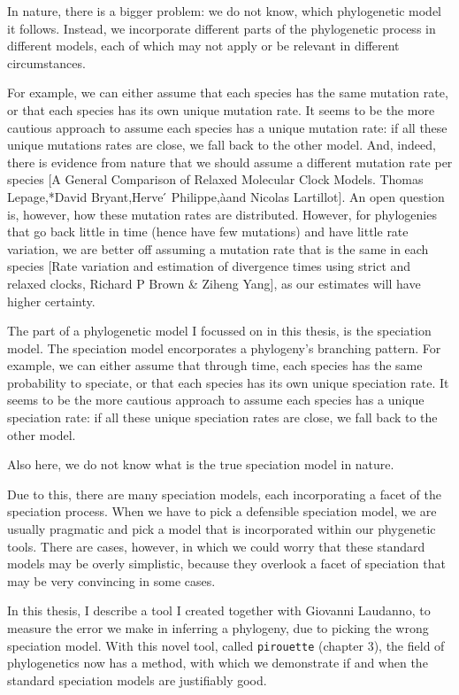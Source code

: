 In nature, there is a bigger problem: 
we do not know, which phylogenetic model it follows.
Instead, we incorporate different parts
of the phylogenetic process in different models, 
each of which may not apply or be relevant in different circumstances.

For example, we can either assume that each species has the same
mutation rate, or that each species has
its own unique mutation rate.
It seems to be the more cautious approach to
assume each species has a unique mutation rate: 
if all these unique mutations rates are close, we fall back
to the other model.
And, indeed, there is evidence from nature that we should 
assume a different mutation rate per species [A General Comparison of Relaxed Molecular Clock Models. Thomas Lepage,*David Bryant,Herve ́ Philippe,àand Nicolas Lartillot].
An open question is, however, how these mutation rates are distributed.
However, for phylogenies that go back little in time (hence
have few mutations) and have little rate variation,
we are better off assuming a mutation rate that is the same in each
species [Rate variation and estimation of divergence times using strict and relaxed clocks, Richard P Brown & Ziheng Yang],
as our estimates will have higher certainty.

The part of a phylogenetic model I focussed on in this thesis,
is the speciation model. The speciation model encorporates
a phylogeny's branching pattern. 
For example, we can either assume that through time,
each species has the same probability to speciate, 
or that each species has
its own unique speciation rate.
It seems to be the more cautious approach to
assume each species has a unique speciation rate: 
if all these unique speciation rates are close, we fall back
to the other model.


Also here, we do not know what is the
true speciation model in nature.

Due to this, there are many speciation models, each
incorporating a facet of the speciation process. When we have to
pick a defensible speciation model, we are usually pragmatic and
pick a model that is incorporated within our phygenetic
tools. There are cases, however, in which we could worry that these
standard models may be overly simplistic, because they overlook a 
facet of speciation that may be very convincing in some cases.

In this thesis, I describe a tool I created together with Giovanni Laudanno, 
to measure the error we make in inferring a phylogeny, due to
picking the wrong speciation model. 
With this novel tool, called \verb;pirouette; (chapter 3),
the field of phylogenetics now has a method, 
with which we demonstrate if and when the standard speciation models
are justifiably good. 

